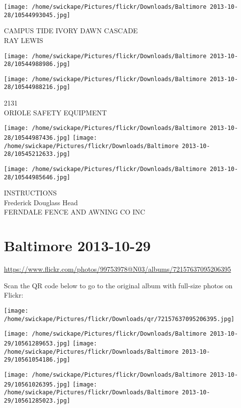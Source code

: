 \documentclass[10pt,letterpaper]{article}
\begin{document}
\vspace{0.25in}
\texttt{[image: /home/swickape/Pictures/flickr/Downloads/Baltimore 2013-10-28/10544993045.jpg]}

CAMPUS TIDE IVORY DAWN CASCADE\\
RAY LEWIS
\pagebreak

\texttt{[image: /home/swickape/Pictures/flickr/Downloads/Baltimore 2013-10-28/10544988986.jpg]}

\vspace{0.25in}
\texttt{[image: /home/swickape/Pictures/flickr/Downloads/Baltimore 2013-10-28/10544988216.jpg]}

2131\\
ORIOLE SAFETY EQUIPMENT
\pagebreak

\texttt{[image: /home/swickape/Pictures/flickr/Downloads/Baltimore 2013-10-28/10544987436.jpg]}
\texttt{[image: /home/swickape/Pictures/flickr/Downloads/Baltimore 2013-10-28/10545212633.jpg]}

\texttt{[image: /home/swickape/Pictures/flickr/Downloads/Baltimore 2013-10-28/10544985646.jpg]}

INSTRUCTIONS\\
Frederick Douglass Head\\
FERNDALE FENCE AND AWNING CO INC
\pagebreak

\section*{Baltimore 2013-10-29}

\url{https://www.flickr.com/photos/99753978@N03/albums/72157637095206395}

Scan the QR code below to go to the original album with full-size photos on Flickr:

\texttt{[image: /home/swickape/Pictures/flickr/Downloads/qr/72157637095206395.jpg]}
\pagebreak

\texttt{[image: /home/swickape/Pictures/flickr/Downloads/Baltimore 2013-10-29/10561289653.jpg]}
\texttt{[image: /home/swickape/Pictures/flickr/Downloads/Baltimore 2013-10-29/10561054186.jpg]}

\texttt{[image: /home/swickape/Pictures/flickr/Downloads/Baltimore 2013-10-29/10561026395.jpg]}
\texttt{[image: /home/swickape/Pictures/flickr/Downloads/Baltimore 2013-10-29/10561285023.jpg]}
\end{document}
